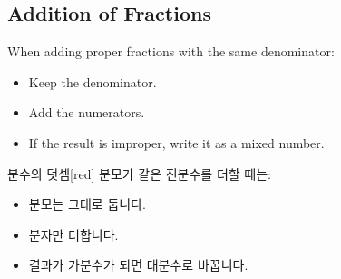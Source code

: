 \documentclass[12pt]{book}
\begin{document}









\twosidedpaper
\subsection{Addition of Fractions}

When adding proper fractions with the same denominator:  

\begin{itemize}
  \item Keep the denominator.  
  \item Add the numerators.  
  \item If the result is improper, write it as a mixed number.  
\end{itemize}

\begin{flexbox}{분수의 덧셈}[red]
분모가 같은 진분수를 더할 때는:  
\begin{itemize}
  \item 분모는 그대로 둡니다.  
  \item 분자만 더합니다.  
  \item 결과가 가분수가 되면 대분수로 바꿉니다.  
\end{itemize}
\end{flexbox}
\end{document}
